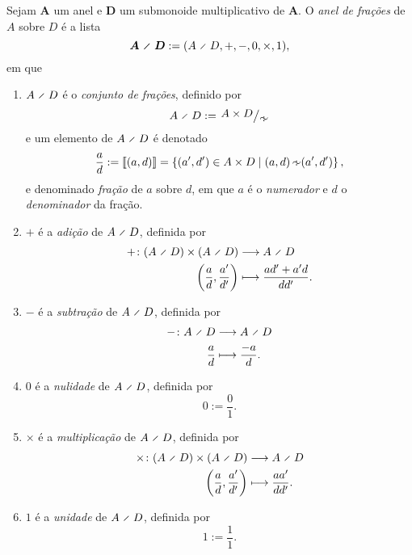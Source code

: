 \begin{definition}
Sejam $\bm A$ um anel e $\bm D$ um submonoide multiplicativo de $\bm A$. O \emph{anel de frações} de $A$ sobre $D$ é a lista
	\begin{equation*}
	\bm{A \olddiv D} := (A \olddiv D,+,-,0,\times,1),
	\end{equation*}
em que
\begin{enumerate}
	\item $A \olddiv D$ é o \emph{conjunto de frações}, definido por
		\begin{equation*}
		A \olddiv D := \quo{A \times D}{\simfra}
		\end{equation*}
e um elemento de $A \olddiv D$ é denotado
		\begin{equation*}
		\frac{a}{d} := \cla{(a,d)} = \set{(a',d') \in A \times D}{(a,d) \simfra (a',d')},
		\end{equation*}
e denominado \emph{fração} de $a$ sobre $d$, em que $a$ é o \emph{numerador} e $d$ o \emph{denominador} da fração.
	\item $+$ é a \emph{adição} de $A \olddiv D$, definida por
		\begin{align*}
		\func{+}{(A \olddiv D) \times (A \olddiv D)}{A \olddiv D}{\left( \frac{a}{d}, \frac{a'}{d'} \right)}{\frac{ad'+a'd}{dd'}}.
		\end{align*}
	\item $-$ é a \emph{subtração} de $A \olddiv D$, definida por
		\begin{align*}
		\func{-}{A \olddiv D}{A \olddiv D}{\frac{a}{d}}{\frac{-a}{d}}.
		\end{align*}
	\item $0$ é a \emph{nulidade} de $A \olddiv D$, definida por
		\begin{equation*}
		0 := \frac{0}{1}.
		\end{equation*}
	\item $\times$ é a \emph{multiplicação} de $A \olddiv D$, definida por
		\begin{align*}
		\func{\times}{(A \olddiv D) \times (A \olddiv D)}{A \olddiv D}{\left( \frac{a}{d}, \frac{a'}{d'} \right)}{\frac{aa'}{dd'}}.
		\end{align*}
	\item $1$ é a \emph{unidade} de $A \olddiv D$, definida por
		\begin{equation*}
		1 := \frac{1}{1}.
		\end{equation*}
\end{enumerate}
\end{definition}

